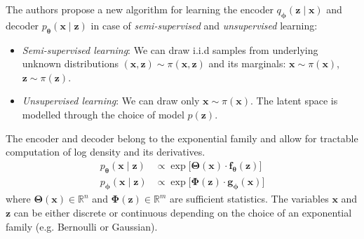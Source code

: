 The authors propose a new algorithm for learning the encoder $q_{\boldsymbol{\phi}}(\boldsymbol{z} \mid \boldsymbol{x})$ and 
decoder $p_{\boldsymbol{\theta}}(\boldsymbol{x} \mid \boldsymbol{z})$ in case of \textit{semi-supervised} and 
\textit{unsupervised} learning:
\begin{itemize}
    \item \textit{Semi-supervised learning}: We can draw i.i.d samples from underlying unknown distributions $(\boldsymbol{x},\boldsymbol{z})  \sim \pi(\boldsymbol{x},\boldsymbol{z})$
    and its marginals: $\boldsymbol{x} \sim \pi(\boldsymbol{x})$, $\boldsymbol{z} \sim \pi(\boldsymbol{z})$.
    \item \textit{Unsupervised learning}: We can draw only $\boldsymbol{x} \sim \pi(\boldsymbol{x})$. The latent space is modelled
    through the choice of model $p(\boldsymbol{z})$.
\end{itemize}

The encoder and decoder belong to the exponential family and allow for tractable computation of log density and its derivatives.
\begin{align*}
    p_{\boldsymbol{\theta}}(\boldsymbol{x} \mid \boldsymbol{z}) &\propto \exp \bigl[ \boldsymbol{\Theta}(\boldsymbol{x}) \cdot \boldsymbol{f}_{\boldsymbol{\theta}}(\boldsymbol{z}) \bigr] \\
    p_{\boldsymbol{\phi}}(\boldsymbol{x} \mid \boldsymbol{z}) &\propto \exp \bigl[ \boldsymbol{\Phi}(\boldsymbol{z}) \cdot \boldsymbol{g}_{\boldsymbol{\phi}}(\boldsymbol{x}) \bigr]
\end{align*} 
where $\boldsymbol{\Theta}(\boldsymbol{x}) \in \mathbb{R}^n$ and $ \boldsymbol{\Phi}(\boldsymbol{z}) \in \mathbb{R}^m$ are sufficient
statistics. The variables $\boldsymbol{x}$ and $\boldsymbol{z}$ can be either discrete or continuous depending on the choice of an exponential family (e.g. Bernoulli or Gaussian).

